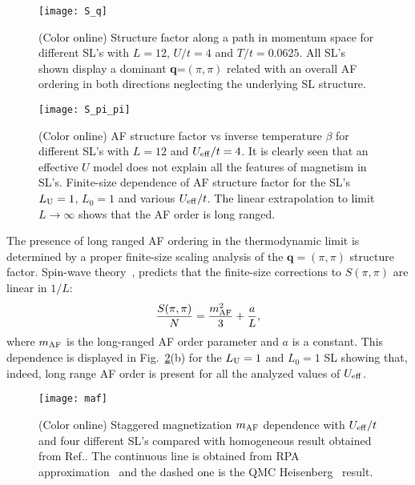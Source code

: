 \documentclass[aps,pra,reprint,twocolumn,showpacs,longbibliography,superscriptaddress]{revtex4-1}
\begin{document}
\begin{figure}[!tb] %
  \texttt{[image: S\_q]}
 \caption{(Color online) Structure factor along a path in momentum space for different SL's with $L=12$, $U/t=4$ and $T/t=0.0625$.  All SL's shown display a dominant \textbf{q}=$(\pi,\pi)$ related with an overall AF ordering in both directions neglecting the underlying SL structure.}
 \label{fig:S_q}
\end{figure}

\begin{figure}[!tb] %
  \texttt{[image: S\_pi\_pi]}
 \caption{(Color online)  AF structure factor vs inverse temperature $\beta$ for different SL's with $L=12$ and $U_{\rm eff}/t =4$. It is clearly seen that an effective $U$ model does not explain all the features of magnetism in SL's. Finite-size dependence of AF structure factor for the SL's $L_{\rm U}=1$, $ L_0=1$ and various $U_{\rm eff}/t$. The linear extrapolation to limit $L\rightarrow\infty$ shows that the AF order is long ranged.}
 \label{fig:S_pi_pi}
\end{figure}

The presence of long ranged AF ordering in the thermodynamic limit is determined by a proper finite-size scaling analysis of the $\textbf{q}=(\pi,\pi)$ structure factor. Spin-wave theory~\cite{Huse88}, predicts that the finite-size corrections to $S(\pi,\pi)$ are linear in $1/L$:
\begin{equation}
\frac{S(\pi,\pi)}{N}=\frac{m_{\rm AF}^2}{3} + \frac{a}{L},
\end{equation}
where $m_{\rm AF}$ is the long-ranged AF order parameter and $a$ is a constant. This dependence is displayed in Fig.~\ref{fig:S_pi_pi}(b) for the $L_{\rm U}=1$ and $L_0=1$ SL showing that, indeed, long range AF order is present for all the analyzed values of $U_{\rm eff}$.

\begin{figure}[!tb] %
  \texttt{[image: maf]}
 \caption{(Color online)  Staggered magnetization $m_{\rm AF}$ dependence with $U_{\rm eff}/t$ and four different SL's compared with homogeneous result obtained from Ref.. The continuous line is obtained from RPA approximation~\cite{Schrieffer89} and the dashed one is the QMC Heisenberg~\cite{sandvik} result.}
 \label{fig:m_AFvsU_eff}
\end{figure}
\end{document}
